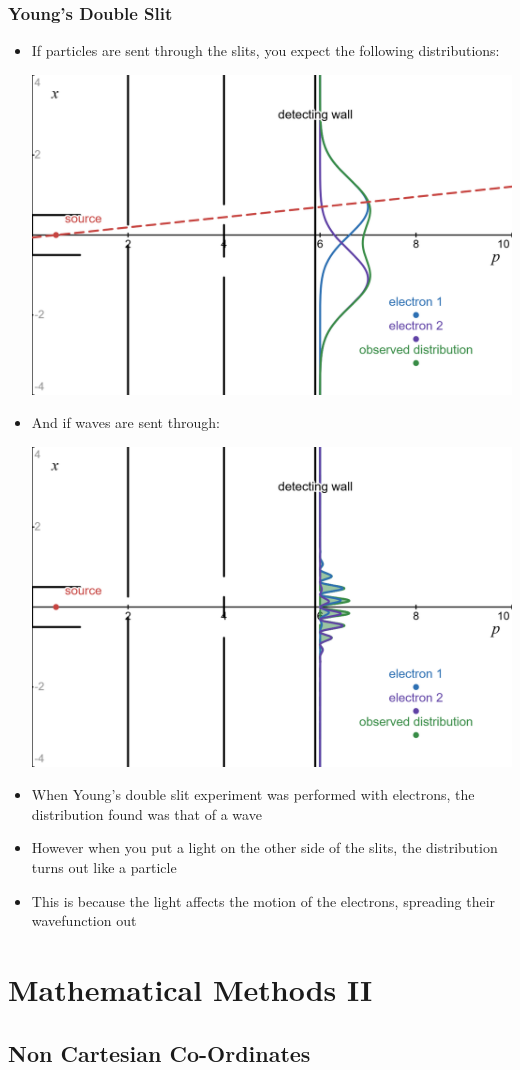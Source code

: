 \documentclass{article}
\begin{document}
\subsubsection*{Young's Double Slit}
\begin{itemize}
    \item If particles are sent through the slits, you expect the following distributions:

    \includegraphics[width=0.5\linewidth]{year1/i2q/youngs slit.png}
    \item And if waves are sent through:
    
    \includegraphics[width=0.5\linewidth]{year1/i2q/youngs slit wave.png}
    \item When Young's double slit experiment was performed with electrons, the distribution found was that of a wave
    \item However when you put a light on the other side of the slits, the distribution turns out like a particle
    \item This is because the light affects the motion of the electrons, spreading their wavefunction out

\end{itemize}

\newpage
\section{Mathematical Methods II}
\subsection{Non Cartesian Co-Ordinates}
\end{document}
